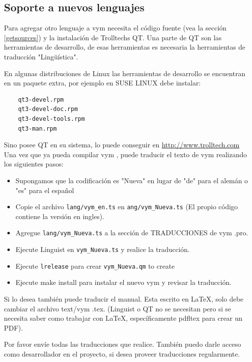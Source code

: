 \documentclass{article}
\newcommand{\vym}{{\sc vym }}
\begin{document}
\begin{appendix}
\subsection{Soporte a nuevos lenguajes}
Para agregar otro lenguaje a \vym necesita el c\'odigo fuente (vea la secci\'on \ref{getsources})  y la instalaci\'on de Trolltechs QT. Una parte de QT son las herramientas de desarrollo, de esas herramientas es necesaria la herramientas de traducci\'on "Lingü\'istica".

En algunas distribuciones de Linux las herramientas de desarrollo se encuentran en un paquete extra, por ejemplo en SUSE LINUX debe instalar:
\begin{verbatim}
    qt3-devel.rpm
    qt3-devel-doc.rpm
    qt3-devel-tools.rpm
    qt3-man.rpm
\end{verbatim}
Sino posee QT en su sistema, lo puede conseguir en 
	\href{http://www.trolltech.com}{http://www.trolltech.com}
Una vez que ya pueda compilar \vym, puede traducir el texto de \vym realizando los siguientes pasos:
\begin{itemize}
	\item Supongamos que la codificaci\'on es "Nueva" en lugar de "de" para el alem\'an o "es" para el espa\~nol
	
	\item Copie el archivo {\tt lang/vym\_en.ts} en {\tt ang/vym\_Nueva.ts} (El propio c\'odigo contiene la versi\'on en ingles). 
		
	\item Agregue  {\tt lang/vym\_Nueva.ts} a la secci\'on de TRADUCCIONES de \vym.pro. 

	\item Ejecute Linguist en {\tt vym\_Nueva.ts} y realice la traducci\'on.  

	\item Ejecute {\tt lrelease}  para crear {\tt vym\_Nueva.qm} to create 

	\item Ejecute make install para instalar el nuevo \vym y revisar la traducci\'on.
\end{itemize}

Si lo desea tambi\'en puede traducir el manual. Esta escrito en LaTeX, solo debe cambiar el archivo text/\vym.tex. (Linguist o QT no se necesitan pero si se necesita saber como trabajar con LaTeX, espec\'ificamente pdfltex para crear un PDF).

Por favor env\'ie todas las traducciones que realice. Tambi\'en puedo darle acceso como desarrollador en el proyecto, si desea proveer traducciones regularmente.


\end{appendix}
\end{document}
